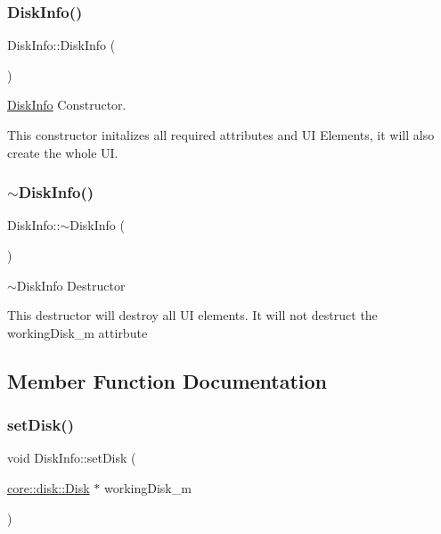 \subsubsection{\texorpdfstring{Disk\+Info()}{DiskInfo()}}
{\footnotesize\ttfamily Disk\+Info\+::\+Disk\+Info (\begin{DoxyParamCaption}{ }\end{DoxyParamCaption})}



\mbox{\hyperlink{classui_1_1window_1_1_disk_info}{Disk\+Info}} Constructor. 

This constructor initalizes all required attributes and UI Elements, it will also create the whole UI. \mbox{\label{classui_1_1window_1_1_disk_info_a8a4c3385e2661ba6dc614d00f8dec9d9}} 
\subsubsection{\texorpdfstring{$\sim$\+Disk\+Info()}{~DiskInfo()}}
{\footnotesize\ttfamily Disk\+Info\+::$\sim$\+Disk\+Info (\begin{DoxyParamCaption}{ }\end{DoxyParamCaption})}



$\sim$\+Disk\+Info Destructor 

This destructor will destroy all UI elements. It will not destruct the working\+Disk\+\_\+m attirbute 

\subsection{Member Function Documentation}
\mbox{\label{classui_1_1window_1_1_disk_info_ad818d3e209f7458d33d79a354958035b}} 
\subsubsection{\texorpdfstring{set\+Disk()}{setDisk()}}
{\footnotesize\ttfamily void Disk\+Info\+::set\+Disk (\begin{DoxyParamCaption}\item[{\mbox{\hyperlink{classcore_1_1disk_1_1_disk}{core\+::disk\+::\+Disk}} $\ast$}]{working\+Disk\+\_\+m }\end{DoxyParamCaption})}



